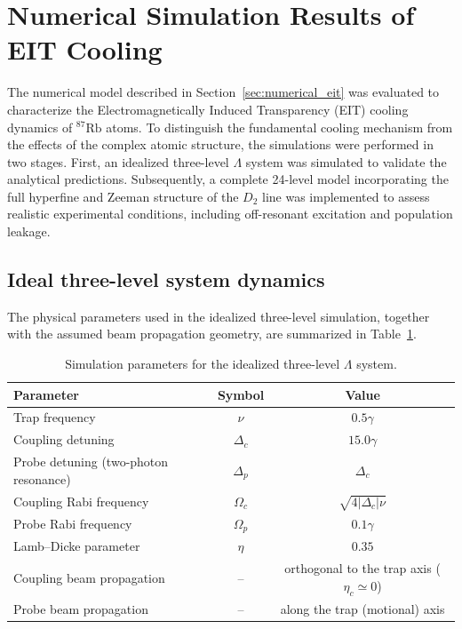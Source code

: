 \section{Numerical Simulation Results of EIT Cooling}
\label{sec:eit_cooling_results}

The numerical model described in Section~\ref{sec:numerical_eit} was evaluated to characterize the Electromagnetically Induced Transparency (EIT) cooling dynamics of $^{87}\mathrm{Rb}$ atoms. To distinguish the fundamental cooling mechanism from the effects of the complex atomic structure, the simulations were performed in two stages. First, an idealized three-level $\Lambda$ system was simulated to validate the analytical predictions. Subsequently, a complete 24-level model incorporating the full hyperfine and Zeeman structure of the $D_2$ line was implemented to assess realistic experimental conditions, including off-resonant excitation and population leakage.

\subsection{Ideal three-level system dynamics}
\label{subsec:results_three_level}

The physical parameters used in the idealized three-level simulation, together with the assumed beam propagation geometry, are summarized in Table~\ref{tab:optimal_parameters_3level}.

\begin{table}[htbp]
\centering
\caption{Simulation parameters for the idealized three-level $\Lambda$ system.}
\label{tab:optimal_parameters_3level}
\begin{tabular}{lcc}
\hline
\textbf{Parameter} & \textbf{Symbol} & \textbf{Value} \\
\hline
Trap frequency & $\nu$ & $0.5\gamma$ \\
Coupling detuning & $\Delta_c$ & $15.0\gamma$ \\
Probe detuning (two-photon resonance) & $\Delta_p$ & $\Delta_c$ \\
Coupling Rabi frequency & $\Omega_c$ & $\sqrt{4\vert\Delta_c\vert\nu}$ \\
Probe Rabi frequency & $\Omega_p$ & $0.1\gamma$ \\
Lamb--Dicke parameter & $\eta$ & $0.35$ \\
Coupling beam propagation & -- & orthogonal to the trap axis ($\eta_c \simeq 0$) \\
Probe beam propagation & -- & along the trap (motional) axis \\
\hline
\end{tabular}
\end{table}

